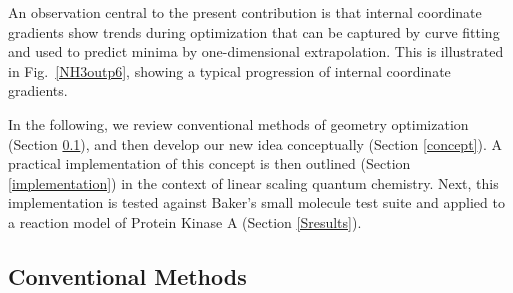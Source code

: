 \documentclass[prl,aps,preprint,superbib,12pt]{revtex4}
\begin{document}

An observation central to the present contribution is that internal coordinate gradients show trends 
during optimization that can be captured by curve fitting and used to predict minima by 
one-dimensional extrapolation.  This is illustrated in Fig.~\ref{NH3outp6}, showing a typical progression of 
internal coordinate gradients.  

In the following, we review conventional methods of geometry optimization (Section \ref{conventional}), 
and then  develop our new idea conceptually (Section \ref{concept}).  A practical implementation of this 
concept is then outlined (Section \ref{implementation}) in the context of linear scaling quantum 
chemistry.  Next, this implementation is tested against Baker's small molecule test suite and applied to 
a reaction model of Protein Kinase A (Section \ref{Sresults}).  

\subsection{Conventional Methods}\label{conventional}
\end{document}
